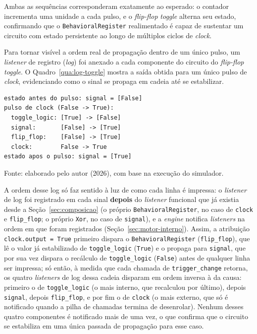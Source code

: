 Ambas as sequências corresponderam exatamente ao esperado: o contador incrementa uma unidade a cada pulso, e o \textit{flip-flop} \textit{toggle} alterna seu estado, confirmando que o \texttt{BehavioralRegister} realimentado é capaz de sustentar um circuito com estado persistente ao longo de múltiplos ciclos de \textit{clock}.

Para tornar visível a ordem real de propagação dentro de um único pulso, um \textit{listener} de registro (\textit{log}) foi anexado a cada componente do circuito do \textit{flip-flop} \textit{toggle}. O Quadro~\ref{qua:log-toggle} mostra a saída obtida para um único pulso de \textit{clock}, evidenciando como o sinal se propaga em cadeia até se estabilizar.

\begin{quadro}[H]
\centering
\caption{Log de propagação de um pulso de \textit{clock} no \textit{flip-flop} \textit{toggle}.}
\label{qua:log-toggle}
\begin{minipage}{0.6\textwidth}
\begin{verbatim}
estado antes do pulso: signal = [False]
pulso de clock (False -> True):
  toggle_logic: [True] -> [False]
  signal:       [False] -> [True]
  flip_flop:    [False] -> [True]
  clock:        False -> True
estado apos o pulso: signal = [True]
\end{verbatim}
\end{minipage}
\begin{center}
\footnotesize Fonte: elaborado pelo autor (2026), com base na execução do simulador.
\end{center}
\end{quadro}

A ordem desse log só faz sentido à luz de como cada linha é impressa: o \textit{listener} de log foi registrado em cada sinal \textbf{depois} do \textit{listener} funcional que já existia desde a Seção~\ref{sec:composicao} (o próprio \texttt{BehavioralRegister}, no caso de \texttt{clock} e \texttt{flip\_flop}; o próprio \texttt{Xor}, no caso de \texttt{signal}), e a \textit{engine} notifica \textit{listeners} na ordem em que foram registrados (Seção~\ref{sec:motor-interno}). Assim, a atribuição \texttt{clock.output = True} primeiro dispara o \texttt{BehavioralRegister} (\texttt{flip\_flop}), que lê o valor já estabilizado de \texttt{toggle\_logic} (\texttt{True}) e o propaga para \texttt{signal}, que por sua vez dispara o recálculo de \texttt{toggle\_logic} (\texttt{False}) antes de qualquer linha ser impressa; só então, à medida que cada chamada de \texttt{trigger\_change} retorna, os quatro \textit{listeners} de log dessa cadeia disparam em ordem inversa à da causa: primeiro o de \texttt{toggle\_logic} (o mais interno, que recalculou por último), depois \texttt{signal}, depois \texttt{flip\_flop}, e por fim o de \texttt{clock} (o mais externo, que só é notificado quando a pilha de chamadas termina de desenrolar). Nenhum desses quatro componentes é notificado mais de uma vez, o que confirma que o circuito se estabiliza em uma única passada de propagação para esse caso.

